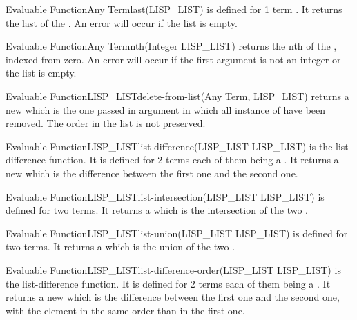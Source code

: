\begin{typeefa}{Evaluable Function}{Any Term}{last}{(LISP\_LIST)}
 is defined for 1 term . It returns the last  of
 the . An error will occur if the list is empty.
\end{typeefa}

\begin{typeefa}{Evaluable Function}{Any Term}{nth}{(Integer LISP\_LIST)}
 returns the nth  of
 the , indexed from zero. An error will occur if the first argument is not an
integer or the list is empty.
\end{typeefa}

\begin{typeefa}{Evaluable Function}{LISP\_LIST}{delete-from-list}{(Any Term, LISP\_LIST)}
returns a new  which is the one passed in argument in which all
instance of  have been removed. The order in the list is not preserved.
\end{typeefa}

\begin{typeefa}{Evaluable Function}{LISP\_LIST}{list-difference}{(LISP\_LIST
LISP\_LIST)}
is the list-difference function. It is defined for 2 terms each of them
being a . It returns a new  which is the difference
between the first one and the second one.
\end{typeefa}

\begin{typeefa}{Evaluable Function}{LISP\_LIST}{list-intersection}{(LISP\_LIST
LISP\_LIST)} is defined for two  terms. It returns a
 which is the intersection of the two .
\end{typeefa}

\begin{typeefa}{Evaluable Function}{LISP\_LIST}{list-union}{(LISP\_LIST
LISP\_LIST)} is defined for two  terms. It returns a
 which is the union of the two .
\end{typeefa}

\begin{typeefa}{Evaluable Function}{LISP\_LIST}{list-difference-order}{(LISP\_LIST LISP\_LIST)}
is the list-difference function. It is defined for 2 terms each of them
being a . It returns a new  which is the difference
between the first one and the second one, with the element in the same
order than in the first one.
\end{typeefa}

